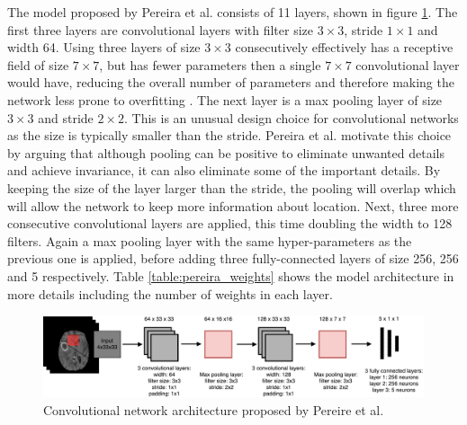 \documentclass[12pt,a4paper,twoside,openright]{report}
\begin{document}
The model proposed by Pereira et al. \cite{pereira} consists of 11 layers, shown in figure \ref{fig:pereira_model}. The first three layers are convolutional layers with filter size $3 \times 3$, stride $1 \times 1$ and width 64. Using three layers of size $3 \times 3$ consecutively effectively has a receptive field of size $7 \times 7$, but has fewer parameters then a single $7 \times 7$ convolutional layer would have, reducing the overall number of parameters and therefore making the network less prone to overfitting \cite{very_deep_conv_nets}. The next layer is a max pooling layer of size $3 \times 3$ and stride $2 \times 2$. This is an unusual design choice for convolutional networks as the size is typically smaller than the stride. Pereira et al. motivate this choice by arguing that although pooling can be positive to eliminate unwanted details and achieve invariance, it can also eliminate some of the important details. By keeping the size of the layer larger than the stride, the pooling will overlap which will allow the network to keep more information about location. Next, three more consecutive convolutional layers are applied, this time doubling the width to 128 filters. Again a max pooling layer with the same hyper-parameters as the previous one is applied, before adding three fully-connected layers of size 256, 256 and 5 respectively. Table \ref{table:pereira_weights} shows the model architecture in more details including the number of weights in each layer. 

\begin{figure}
	\centering
	\includegraphics[width=\textwidth]{pereira_model}
	\caption{Convolutional network architecture proposed by Pereire et al.}
	\label{fig:pereira_model}
\end{figure}
\end{document}
